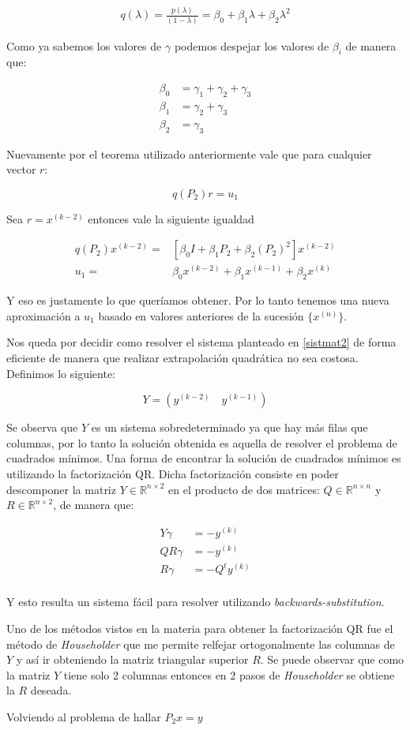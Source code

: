 \begin{align}
	q(\lambda) = \frac{p(\lambda)}{(1-\lambda)} = \beta_{0} + \beta_{1}\lambda + \beta_{2}\lambda^{2} \label{polq}
\end{align}

Como ya sabemos los valores de $\gamma$ podemos despejar los valores de $\beta_{i}$ de manera que:

\begin{align*}
	\beta_{0} &= \gamma_{1} + \gamma_{2} + \gamma_{3} \\
	\beta_{1} &= \gamma_{2} + \gamma_{3} \\
	\beta_{2} &= \gamma_{3}
\end{align*}

Nuevamente por el teorema utilizado anteriormente vale que para cualquier vector $r$:

\[
	q(P_{2})r = u_{1}
\]

Sea $r = x^{(k-2)}$ entonces vale la siguiente igualdad

\begin{align*}
	q(P_{2})x^{(k-2)} =& [\beta_{0}I + \beta_{1}P_{2} + \beta_{2}(P_{2})^{2}]x^{(k-2)}\\
	u_{1} =& \beta_{0}x^{(k-2)} + \beta_{1}x^{(k-1)} + \beta_{2}x^{(k)}
\end{align*}

Y eso es justamente lo que quer\'iamos obtener. Por lo tanto tenemos una nueva aproximaci\'on a $u_{1}$ basado en valores anteriores de la sucesi\'on $\{x^{(n)}\}$.

Nos queda por decidir como resolver el sistema planteado en \eqref{sistmat2} de forma eficiente de manera que realizar extrapolaci\'on quadr\'atica no sea costosa. Definimos lo siguiente:

\[
	Y = \left(y^{(k-2)} \quad y^{(k-1)}\right)
\]


Se observa que $Y$ es un sistema sobredeterminado ya que hay m\'as filas que columnas, por lo tanto la soluci\'on obtenida es aquella de resolver el problema de cuadrados m\'inimos. Una forma de encontrar la soluci\'on de cuadrados m\'inimos es utilizando la factorizaci\'on QR. Dicha factorizaci\'on consiste en poder descomponer la matriz $Y \in \mathbb{R}^{n \times 2}$ en el producto de dos matrices: $Q\in \mathbb{R}^{n \times n}$ y $R\in \mathbb{R}^{n \times 2}$, de manera que:

\begin{align*}
	Y\gamma &=-y^{(k)}\\
	QR\gamma &=-y^{(k)}\\
	R\gamma &=-Q^{t}y^{(k)}\\
\end{align*}

Y esto resulta un sistema f\'acil para resolver utilizando \emph{backwards-substitution}.

Uno de los m\'etodos vistos en la materia para obtener la factorizaci\'on QR fue el m\'etodo de \emph{Householder} que me permite relfejar ortogonalmente las columnas de $Y$ y as\'i ir obteniendo la matriz triangular superior $R$. Se puede observar que como la matriz $Y$ tiene solo 2 columnas entonces en 2 pasos de \emph{Householder} se obtiene la $R$ deseada.

Volviendo al problema de hallar $P_{2}x = y$ 